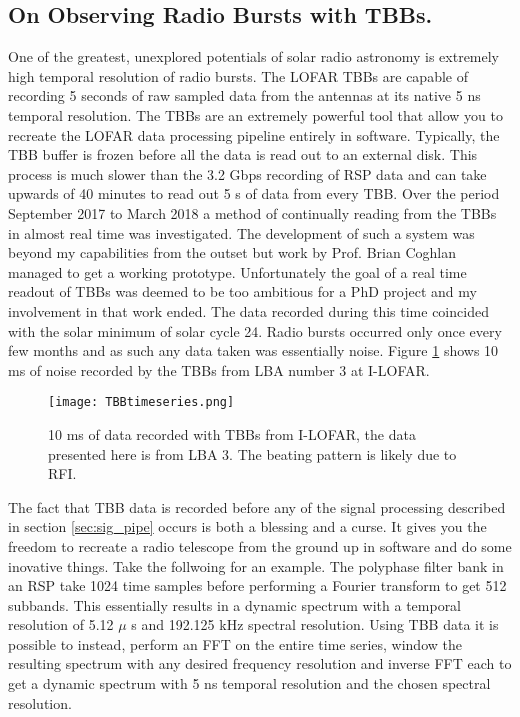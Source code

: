 \subsection{On Observing Radio Bursts with TBBs.}
One of the greatest, unexplored potentials of solar radio astronomy is extremely high temporal resolution of radio bursts. The LOFAR TBBs are capable of recording 5 seconds of raw sampled data from the antennas at its native 5 ns temporal resolution. The TBBs are an extremely powerful tool that allow you to recreate the LOFAR data processing pipeline entirely in software. Typically, the TBB buffer is frozen before all the data is read out to an external disk. This process is much slower than the 3.2 Gbps recording of RSP data and can take upwards of 40 minutes to read out 5 s of data from every TBB. Over the period September 2017 to March 2018 a method of continually reading from the TBBs in almost real time was investigated. The development of such a system was beyond my capabilities from the outset but work by Prof. Brian Coghlan managed to get a working prototype. Unfortunately the goal of a real time readout of TBBs was deemed to be too ambitious for a PhD project and my involvement in that work ended. The data recorded during this time coincided with the solar minimum of solar cycle 24. Radio bursts occurred only once every few months and as such any data taken was essentially noise. Figure \ref{fig:TBB_timeseries} shows 10 ms of noise recorded by the TBBs from LBA number 3 at I-LOFAR.
%
\begin{figure}[ht]
\centering
\texttt{[image: TBBtimeseries.png]}
\caption[10 ms of data recorded with TBBs from I-LOFAR.]{10 ms of data recorded with TBBs from I-LOFAR, the data presented here is from LBA 3. The beating pattern is likely due to RFI.}
\label{fig:TBB_timeseries}
\end{figure}

The fact that TBB data is recorded before any of the signal processing described in section \ref{sec:sig_pipe} occurs is both a blessing and a curse. It gives you the freedom to recreate a radio telescope from the ground up in software and do some inovative things. Take the follwoing for an example. The polyphase filter bank in an RSP take 1024 time samples before performing a Fourier transform to get 512 subbands. This essentially results in a dynamic spectrum with a temporal resolution of 5.12 $\mu$ s and 192.125 kHz spectral resolution. Using TBB data it is possible to instead, perform an FFT on the entire time series, window the resulting spectrum with any desired frequency resolution and inverse FFT each to get a dynamic spectrum with 5 ns temporal resolution and the chosen spectral resolution. 

